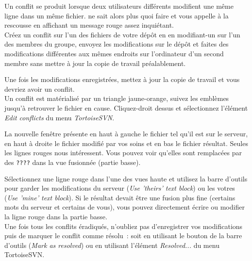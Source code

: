 Un conflit se produit lorsque deux utilisateurs différents modifient une même ligne dans un même fichier. \svn{} ne sait alors plus quoi faire et vous appelle à la rescousse en affichant un message rouge assez inquiétant.\\

Créez un conflit sur l'un des fichiers de votre dépôt en en modifiant-un sur l'un des membres du groupe, envoyez les modifications sur le dépôt et faites des modifications différentes aux mêmes endroits sur l'ordinateur d'un second membre sans mettre à jour la copie de travail préalablement.

Une fois les modifications enregistrées, mettez à jour la copie de travail et vous devriez avoir un conflit.\\

Un conflit est matérialisé par un triangle jaune-orange, suivez les emblèmes jusqu'à retrouver le fichier en cause. Cliquez-droit dessus et sélectionnez l'élément \emph{Edit conflicts} du menu \emph{TortoiseSVN}.

La nouvelle fenêtre présente en haut à gauche le fichier tel qu'il est sur le serveur, en haut à droite le fichier modifié par vos soins et en bas le fichier résultat.
Seules les lignes rouges nous intéressent. Vous pouvez voir qu'elles sont remplacées par des \texttt{????} dans la vue fusionnée (partie basse).

Sélectionnez une ligne rouge dans l'une des vues haute et utilisez la barre d'outils pour garder les modifications du serveur (\emph{Use 'theirs' text block}) ou les votres (\emph{Use 'mine' text block}).
Si le résultat devait être une fusion plus fine (certains mots du serveur et certains de vous), vous pouvez directement écrire ou modifier la ligne rouge dans la partie basse.\\

Une fois tous les conflits éradiqués, n'oubliez pas d'enregistrer vos modifications puis de marquer le conflit comme résolu~: soit en utilisant le bouton de la barre d'outils (\emph{Mark as resolved}) ou en utilisant l'élément \emph{Resolved...} du menu TortoiseSVN.

